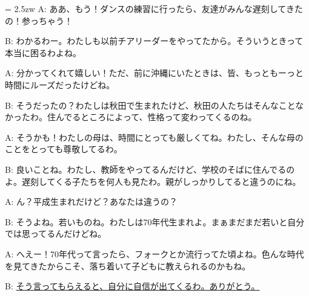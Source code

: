 \documentclass[11pt]{amsart}
\title{}
\author{}
\newenvironment{hangall}[1]{\hangindent = 2.5zw\everypar{\hangindent = 2.5zw}}{}
\begin{document}
\maketitle
\begin{hangall}{}%
A: ああ、もう！ダンスの練習に行ったら、友達がみんな遅刻してきたの！参っちゃう！

B: わかるわー。わたしも以前チアリーダーをやってたから。そういうときって本当に困るわよね。

A: 分かってくれて嬉しい！ただ、前に沖縄にいたときは、皆、もっともーっと時間にルーズだったけどね。

B: そうだったの？わたしは秋田で生まれたけど、秋田の人たちはそんなことなかったわ。住んでるところによって、性格って変わってくるのね。

A: そうかも！わたしの母は、時間にとっても厳しくてね。わたし、そんな母のことをとっても尊敬してるわ。

B: 良いことね。わたし、教師をやってるんだけど、学校のそばに住んでるのよ。遅刻してくる子たちを何人も見たわ。親がしっかりしてると違うのにね。

A: ん？平成生まれだけど？あなたは違うの？

B: そうよね。若いものね。わたしは70年代生まれよ。まぁまだまだ若いと自分では思ってるんだけどね。

A: へえー！70年代って言ったら、フォークとか流行ってた頃よね。色んな時代を見てきたからこそ、落ち着いて子どもに教えられるのかもね。

B: \ul{そう言ってもらえると、自分に自信が出てくるわ。ありがとう。}\end{hangall}
\end{document}
